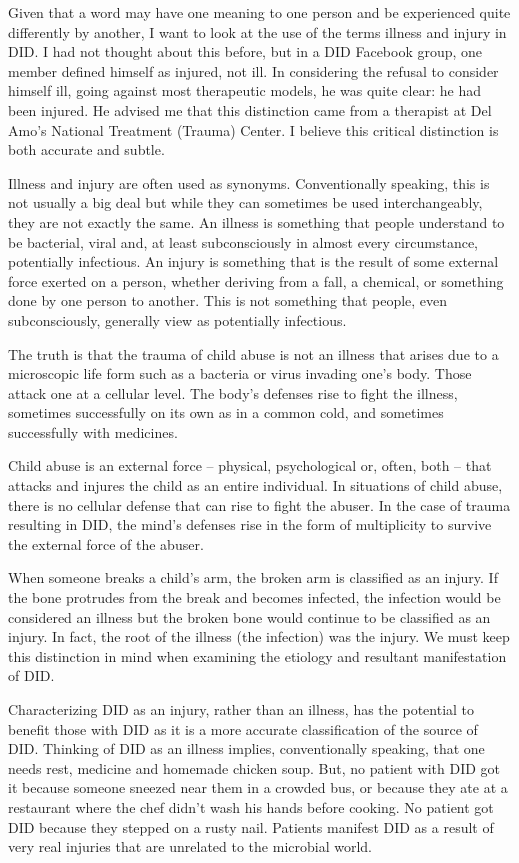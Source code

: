 \documentclass[]{book}
\begin{document}
Given that a word may have one meaning to one person and be experienced quite differently by another, I want to look at the use of the terms illness and injury in DID. I had not thought about this before, but in a DID Facebook group, one member defined himself as injured, not ill. In considering the refusal to consider himself ill, going against most therapeutic models, he was quite clear: he had been injured. He advised me that this distinction came from a therapist at Del Amo's National Treatment (Trauma) Center. I believe this critical distinction is both accurate and subtle.

Illness and injury are often used as synonyms. Conventionally speaking, this is not usually a big deal but while they can sometimes be used interchangeably, they are not exactly the same. An illness is something that people understand to be bacterial, viral and, at least subconsciously in almost every circumstance, potentially infectious. An injury is something that is the result of some external force exerted on a person, whether deriving from a fall, a chemical, or something done by one person to another. This is not something that people, even subconsciously, generally view as potentially infectious.

The truth is that the trauma of child abuse is not an illness that arises due to a microscopic life form such as a bacteria or virus invading one's body. Those attack one at a cellular level. The body's defenses rise to fight the illness, sometimes successfully on its own as in a common cold, and sometimes successfully with medicines.

Child abuse is an external force -- physical, psychological or, often, both -- that attacks and injures the child as an entire individual. In situations of child abuse, there is no cellular defense that can rise to fight the abuser. In the case of trauma resulting in DID, the mind's defenses rise in the form of multiplicity to survive the external force of the abuser.

When someone breaks a child's arm, the broken arm is classified as an injury. If the bone protrudes from the break and becomes infected, the infection would be considered an illness but the broken bone would continue to be classified as an injury. In fact, the root of the illness (the infection) was the injury. We must keep this distinction in mind when examining the etiology and resultant manifestation of DID.

Characterizing DID as an injury, rather than an illness, has the potential to benefit those with DID as it is a more accurate classification of the source of DID. Thinking of DID as an illness implies, conventionally speaking, that one needs rest, medicine and homemade chicken soup. But, no patient with DID got it because someone sneezed near them in a crowded bus, or because they ate at a restaurant where the chef didn't wash his hands before cooking. No patient got DID because they stepped on a rusty nail. Patients manifest DID as a result of very real injuries that are unrelated to the microbial world.
\end{document}
